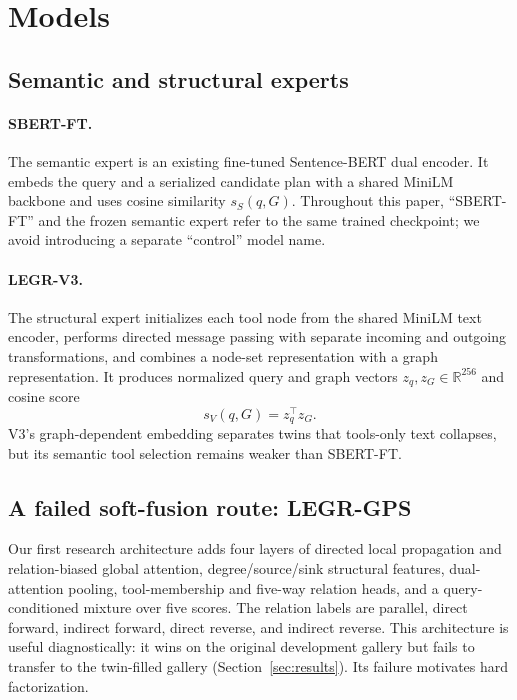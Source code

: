 \documentclass{article}
\newcommand{\sbert}{\textsc{SBERT-FT}}
\newcommand{\vthree}{\textsc{LEGR-V3}}
\newcommand{\gps}{\textsc{LEGR-GPS}}
\begin{document}
\section{Models}

\subsection{Semantic and structural experts}

\paragraph{\sbert.}
The semantic expert is an existing fine-tuned Sentence-BERT dual encoder.
It embeds the query and a serialized candidate plan with a shared MiniLM backbone and uses cosine similarity $s_S(q,G)$.
Throughout this paper, ``\sbert{}'' and the frozen semantic expert refer to the same trained checkpoint; we avoid introducing a separate ``control'' model name.

\paragraph{\vthree.}
The structural expert initializes each tool node from the shared MiniLM text encoder, performs directed message passing with separate incoming and outgoing transformations, and combines a node-set representation with a graph representation.
It produces normalized query and graph vectors $z_q,z_G\in\mathbb R^{256}$ and cosine score
\begin{equation}
    s_V(q,G)=z_q^\top z_G.
\end{equation}
V3's graph-dependent embedding separates twins that tools-only text collapses, but its semantic tool selection remains weaker than \sbert{}.

\subsection{A failed soft-fusion route: \gps}

Our first research architecture adds four layers of directed local propagation and relation-biased global attention, degree/source/sink structural features, dual-attention pooling, tool-membership and five-way relation heads, and a query-conditioned mixture over five scores.
The relation labels are parallel, direct forward, indirect forward, direct reverse, and indirect reverse.
This architecture is useful diagnostically: it wins on the original development gallery but fails to transfer to the twin-filled gallery (Section~\ref{sec:results}).
Its failure motivates hard factorization.
\end{document}
